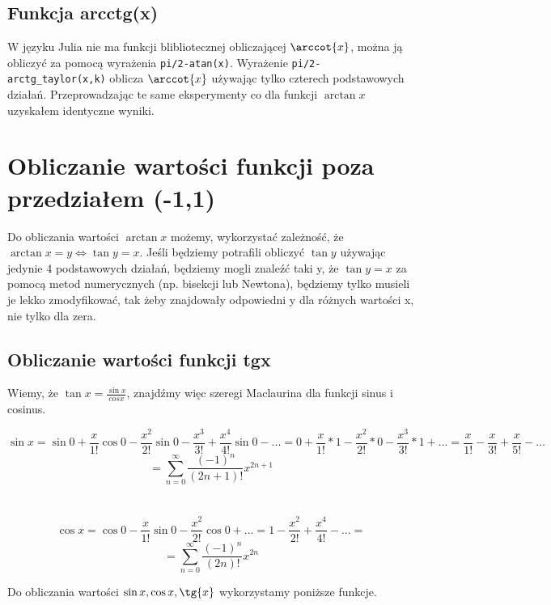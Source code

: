 \documentclass[11pt,a4paper]{article}
\begin{document}
    \subsection{Funkcja arcctg(x)}
    W języku Julia nie ma funkcji blibliotecznej obliczającej $\arccot{x}$, można ją obliczyć za pomocą wyrażenia \verb!pi/2-atan(x)!. Wyrażenie \verb!pi/2-arctg_taylor(x,k)! oblicza $\arccot{x}$ używając tylko czterech podstawowych działań. Przeprowadzając te same eksperymenty co dla funkcji $\arctan{x}$ uzyskałem identyczne wyniki.

    \section{Obliczanie wartości funkcji poza przedziałem (-1,1)}
    Do obliczania wartości $\arctan{x}$ możemy, wykorzystać zależność, że $\arctan{x}=y \Leftrightarrow \tan{y}=x$. Jeśli będziemy potrafili obliczyć $\tan{y}$ używając jedynie 4 podstawowych działań, będziemy mogli znaleźć taki y, że $\tan{y}=x$ za pomocą metod numerycznych (np. bisekcji lub Newtona), będziemy tylko musieli je lekko zmodyfikować, tak żeby znajdowały odpowiedni y dla różnych wartości x, nie tylko dla zera.
    \subsection{Obliczanie wartości funkcji tgx}
    Wiemy, że $\tan{x}=\frac{\sin{x}}{cos{x}}$, znajdźmy więc szeregi Maclaurina dla funkcji sinus i cosinus.

    $$
        \sin{x} = \sin{0}+\frac{x}{1!}\cos{0}-\frac{x^2}{2!}\sin{0}-\frac{x^3}{3!}+\frac{x^4}{4!}\sin{0}-...
        = 0 + \frac{x}{1!}*1 - \frac{x^2}{2!}*0 - \frac{x^3}{3!}*1 + ... = \frac{x}{1!} - \frac{x}{3!} + \frac{x}{5!} - ...$$
    $$    = \sum_{n=0}^{\infty}\frac{(-1)^n}{(2n+1)!}x^{2n+1}$$\\\\

    $$ \cos{x} = \cos{0}-\frac{x}{1!}\sin{0}-\frac{x^2}{2!}\cos{0} + ... = 1 - \frac{x^2}{2!} + \frac{x^4}{4!} - ... = $$
    $$    = \sum_{n=0}^{\infty}\frac{(-1)^n}{(2n)!}x^{2n}$$

    Do obliczania wartości $\sin{x}, \cos{x}, \tg{x}$ wykorzystamy poniższe funkcje.
\end{document}
